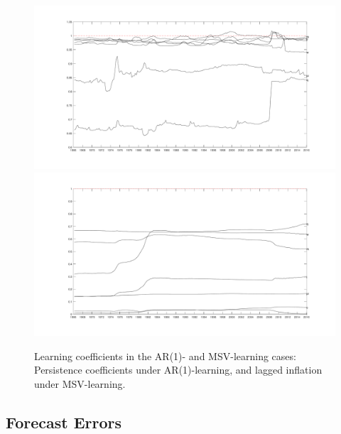 \documentclass[12pt,reqno]{article}
\numberwithin{equation}{section}
\begin{document}
\begin{figure}[H]

\caption{Learning coefficients in the AR(1)- and MSV-learning cases: Persistence coefficients under AR(1)-learning, and lagged inflation under MSV-learning.} 
\label{sw_learning_2}
\vspace{5 mm}

\includegraphics[scale=0.5]{sw_ar1_learning_betas.pdf}\\
\includegraphics[scale=0.5]{sw_msv_learning_laggedInfl.pdf}\\
\end{figure}


\subsection{Forecast Errors}
\end{document}

